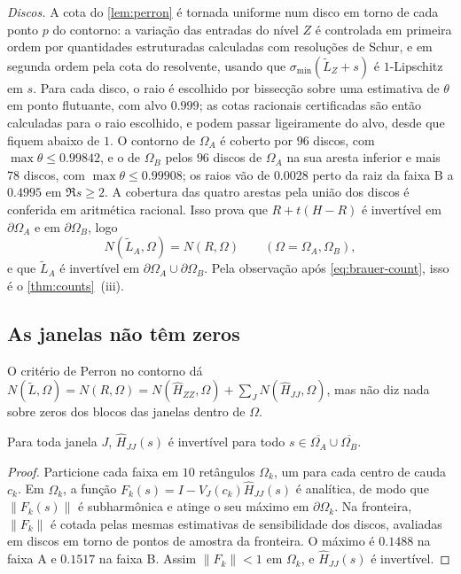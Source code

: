 \emph{Discos.} A cota do \cref{lem:perron} é tornada uniforme num disco em torno de cada ponto $p$ do contorno:
a variação das entradas do nível $Z$ é controlada em primeira ordem por quantidades estruturadas calculadas com
resoluções de Schur, e em segunda ordem pela cota do resolvente, usando que $\sigma_{\min}(\widetilde L_Z+s)$ é
$1$-Lipschitz em $s$. Para cada disco, o raio é escolhido por bissecção sobre uma estimativa de $\theta$ em ponto flutuante, com alvo $0.999$; as
cotas racionais certificadas são então calculadas para o raio escolhido, e podem passar ligeiramente do alvo, desde que
fiquem abaixo de $1$. O contorno de $\Omega_A$ é
coberto por $96$ discos, com $\max\theta\le0.99842$, e o de $\Omega_B$ pelos $96$ discos de $\Omega_A$ na sua
aresta inferior e mais $78$ discos, com $\max\theta\le0.99908$; os raios vão de $0.0028$ perto da raiz da faixa B
a $0.4995$ em $\Re s\ge2$. A cobertura das quatro arestas pela união dos discos é conferida em aritmética
racional. Isso prova que $R+t(H-R)$ é invertível em $\partial\Omega_A$ e em $\partial\Omega_B$, logo
\[
  N(\widetilde L_A,\Omega)=N(R,\Omega)\qquad(\Omega=\Omega_A,\Omega_B),
\]
e que $\widetilde L_A$ é invertível em $\partial\Omega_A\cup\partial\Omega_B$. Pela observação após
\eqref{eq:brauer-count}, isso é o \cref{thm:counts}~(iii).

\subsection{As janelas não têm zeros}\label{sec:counting-windows}

O critério de Perron no contorno dá $N(\widetilde L,\Omega)=N(R,\Omega)=N(\widehat H_{ZZ},\Omega)+
\sum_JN(\widehat H_{JJ},\Omega)$, mas não diz nada sobre zeros dos blocos das janelas dentro de $\Omega$.

\begin{lemma}\label{lem:windows}
Para toda janela $J$, $\widehat H_{JJ}(s)$ é invertível para todo $s\in\overline{\Omega_A}\cup\overline{\Omega_B}$.
\end{lemma}

\begin{proof}
Particione cada faixa em $10$ retângulos $\Omega_k$, um para cada centro de cauda $c_k$. Em $\Omega_k$, a função
$F_k(s)=I-V_J(c_k)\widehat H_{JJ}(s)$ é analítica, de modo que $\|F_k(s)\|$ é subharmônica e atinge o seu máximo em
$\partial\Omega_k$. Na fronteira, $\|F_k\|$ é cotada pelas mesmas estimativas de sensibilidade dos discos,
avaliadas em discos em torno de pontos de amostra da fronteira. O máximo é $0.1488$ na faixa A e $0.1517$ na faixa B.
Assim $\|F_k\|<1$ em $\Omega_k$, e $\widehat H_{JJ}(s)$ é invertível.
\end{proof}

